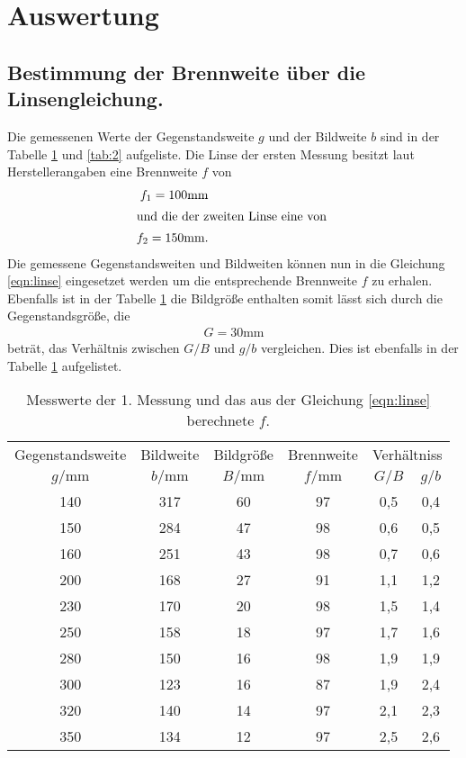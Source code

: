 \section{Auswertung}
\label{sec:Auswertung}
\subsection{Bestimmung der Brennweite über die Linsengleichung.}
\label{sec:1}
Die gemessenen Werte  der Gegenstandsweite $g$ und der Bildweite $b$  sind
in der Tabelle \ref{tab:1} und \ref{tab:2} aufgeliste.
Die Linse der ersten Messung besitzt laut Herstellerangaben eine Brennweite $f$
von
\begin{align*}
  f_1=100\si{\milli\meter}\\
\intertext{und die der zweiten Linse eine von }
  f_2=150\si{\milli\meter}.
\end{align*}
Die gemessene Gegenstandsweiten und Bildweiten können nun in die Gleichung
\eqref{eqn:linse} eingesetzet werden um die entsprechende Brennweite $f$
zu erhalen.
Ebenfalls ist in der Tabelle \ref{tab:1}
die Bildgröße enthalten somit lässt sich durch die Gegenstandsgröße, die
\begin{align*}
  G=30\si{\milli\meter}
\end{align*}
beträt, das Verhältnis zwischen $G/B$ und $g/b$ vergleichen. Dies ist ebenfalls
in der Tabelle \ref{tab:1} aufgelistet.
\begin{table}
  \centering
  \caption{Messwerte der 1. Messung und das aus der Gleichung
   \eqref{eqn:linse} berechnete $f$.}
  \label{tab:1}
  \begin{tabular}{c c c c c c}
  \toprule
  Gegenstandsweite   & Bildweite & Bildgröße & Brennweite & \multicolumn{2}{c}{Verhältniss}\\
  $g/\si{\milli\meter}$ & $b/\si{\milli\meter}$ & $B/\si{\milli\meter}$& $f/\si{\milli\meter}$& $G/B$ &$g/b$\\
  \midrule
  140   &   317  &   60 & 97 &0,5 &0,4 \\
  150   &   284  &   47 & 98 &0,6 &0,5 \\
  160   &   251  &   43 & 98 &0,7 &0,6 \\
  200   &   168  &   27 & 91 &1,1 &1,2 \\
  230   &   170  &   20 & 98 &1,5 &1,4 \\
  250   &   158  &   18 & 97 &1,7 &1,6 \\
  280   &   150  &   16 & 98 &1,9 &1,9 \\
  300   &   123  &   16 & 87 &1,9 &2,4 \\
  320   &   140  &   14 & 97 &2,1 &2,3 \\
  350   &   134  &   12 & 97 &2,5 &2,6 \\
  \bottomrule
 \end{tabular}
\end{table}
